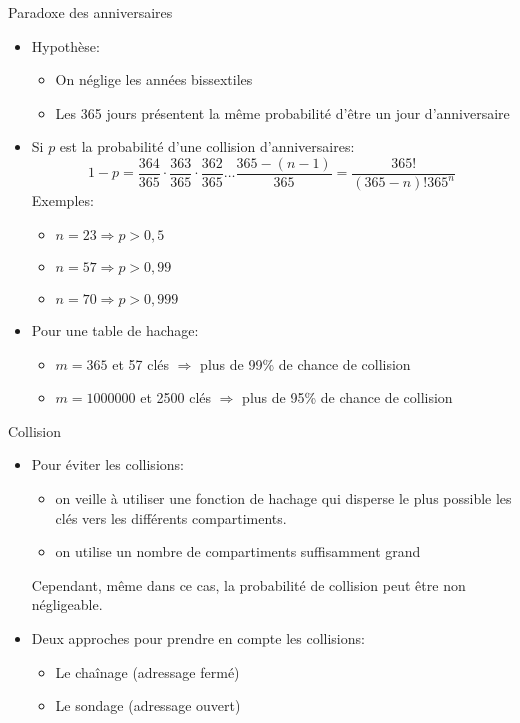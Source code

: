 \begin{frame}{Paradoxe des anniversaires}

\begin{itemize}
\item Hypothèse:
\begin{itemize}
\item On néglige les années bissextiles
\item Les 365 jours présentent la même probabilité d'être un jour d'anniversaire
\end{itemize}
\item Si $p$ est la probabilité d'une collision d'anniversaires:
$$1-p = \frac{364}{365} \cdot \frac{363}{365} \cdot \frac{362}{365} \ldots \frac{365-(n-1)}{365} = \frac{365!}{(365-n)! 365^n}$$
Exemples:
\begin{itemize}
\item $n=23 \Rightarrow p>0,5$
\item $n=57 \Rightarrow p>0,99$
\item $n=70 \Rightarrow p>0,999$
\end{itemize}
\bigskip

\item Pour une table de hachage:
\begin{itemize}
\item $m=365$ et 57 clés $\Rightarrow$ plus de 99\% de chance de collision
\item $m=1000000$ et 2500 clés $\Rightarrow$ plus de 95\% de chance de collision
\end{itemize}
\end{itemize}
\end{frame}

\begin{frame}{Collision}

\begin{itemize}
\item Pour éviter les collisions:
\begin{itemize}
\item on veille à utiliser une fonction de hachage qui disperse le
  plus possible les clés vers les différents compartiments.
\item on utilise un nombre de compartiments suffisamment grand
\end{itemize}
Cependant, même dans ce cas, la probabilité de collision peut
  être non négligeable.

\bigskip

\item Deux approches pour prendre en compte les collisions:
\begin{itemize}
\item Le chaînage (adressage fermé)
\item Le sondage (adressage ouvert)
\end{itemize}
\end{itemize}


\end{frame}



